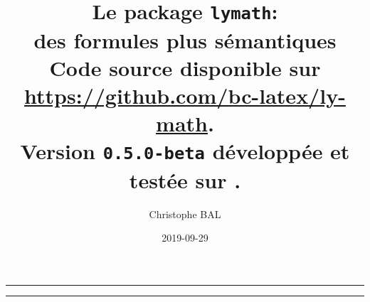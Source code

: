 \documentclass[12pt,a4paper]{article}
\begin{document}
\renewcommand\labelitemi{\raisebox{0.125em}{\tiny\textbullet}}
\renewcommand{\labelitemii}{---}

\title{%
	Le package \texttt{lymath}:\\%
	des formules plus sémantiques\\%
	{\footnotesize Code source disponible sur \url{https://github.com/bc-latex/ly-math}.}\\%
{\footnotesize Version \texttt{0.5.0-beta} développée et testée sur \macosxname{}.}%
}
\author{Christophe BAL}
\date{2019-09-29}

\maketitle


\vspace{2em}

\hrule

\tableofcontents

\vspace{1.5em}

\hrule

\newpage

\end{document}
